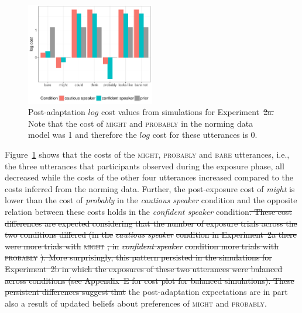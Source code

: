 \documentclass[man, floatsintext]{apa6}
\providecommand{\DIFadd}[1]{{\protect\color{blue}\uwave{#1}}} %
\providecommand{\DIFdel}[1]{{\protect\color{red}\sout{#1}}}                      %
\providecommand{\DIFaddbegin}{} %
\providecommand{\DIFaddend}{} %
\providecommand{\DIFdelbegin}{} %
\providecommand{\DIFdelend}{} %
\providecommand{\DIFaddFL}[1]{\DIFadd{#1}} %
\providecommand{\DIFdelFL}[1]{\DIFdel{#1}} %
\providecommand{\DIFaddbeginFL}{} %
\providecommand{\DIFaddendFL}{} %
\providecommand{\DIFdelbeginFL}{} %
\providecommand{\DIFdelendFL}{} %
\newcommand{\DIFscaledelfig}{0.5}
\newlength{\DIFdelgraphicswidth} %
\newlength{\DIFdelgraphicsheight} %
\newcommand{\DIFaddincludegraphics}[2][]{{\color{blue}\fbox{\DIFOincludegraphics[#1]{#2}}}} %
\newcommand{\DIFdelincludegraphics}[2][]{%
\sbox{\DIFdelgraphicsbox}{\DIFOincludegraphics[#1]{#2}}%
\settoboxwidth{\DIFdelgraphicswidth}{\DIFdelgraphicsbox} %
\settoboxtotalheight{\DIFdelgraphicsheight}{\DIFdelgraphicsbox} %
\scalebox{\DIFscaledelfig}{%
\parbox[b]{\DIFdelgraphicswidth}{\usebox{\DIFdelgraphicsbox}\\[-\baselineskip] \rule{\DIFdelgraphicswidth}{0em}}\llap{\resizebox{\DIFdelgraphicswidth}{\DIFdelgraphicsheight}{%
\setlength{\unitlength}{\DIFdelgraphicswidth}%
\begin{picture}(1,1)%
\thicklines\linethickness{2pt} %
{\color[rgb]{1,0,0}\put(0,0){\framebox(1,1){}}}%
{\color[rgb]{1,0,0}\put(0,0){\line( 1,1){1}}}%
{\color[rgb]{1,0,0}\put(0,1){\line(1,-1){1}}}%
\end{picture}%
}\hspace*{3pt}}} %
} %
\DeclareRobustCommand{\DIFaddbegin}{\DIFOaddbegin \let\includegraphics\DIFaddincludegraphics} %
\DeclareRobustCommand{\DIFaddend}{\DIFOaddend \let\includegraphics\DIFOincludegraphics} %
\DeclareRobustCommand{\DIFdelbegin}{\DIFOdelbegin \let\includegraphics\DIFdelincludegraphics} %
\DeclareRobustCommand{\DIFdelend}{\DIFOaddend \let\includegraphics\DIFOincludegraphics} %
\DeclareRobustCommand{\DIFaddbeginFL}{\DIFOaddbeginFL \let\includegraphics\DIFaddincludegraphics} %
\DeclareRobustCommand{\DIFaddendFL}{\DIFOaddendFL \let\includegraphics\DIFOincludegraphics} %
\DeclareRobustCommand{\DIFdelbeginFL}{\DIFOdelbeginFL \let\includegraphics\DIFdelincludegraphics} %
\DeclareRobustCommand{\DIFdelendFL}{\DIFOaddendFL \let\includegraphics\DIFOincludegraphics} %
\begin{document}
\begin{figure}
\center
  \DIFdelbeginFL %
\DIFdelendFL \DIFaddbeginFL \includegraphics[width=0.5\textwidth]{plots/adaptation-posterior-costs-replication.pdf}
  \DIFaddendFL \caption{Post-adaptation $log$ cost values from simulations for Experiment~\DIFdelbeginFL \DIFdelFL{2a. }\DIFdelendFL \DIFaddbeginFL \DIFaddFL{2. }\DIFaddendFL Note that the cost of \textsc{might} and \textsc{probably} 
  in the norming data model was 1 and therefore the $log$ cost for these utterances is 0. \label{fig:post-exposure-costs}}
\end{figure}

Figure~\ref{fig:post-exposure-costs} shows that the costs of the \textsc{might}, \textsc{probably} and
\textsc{bare} utterances, i.e., the three utterances that participants observed during the exposure phase,
all decreased while the costs of the other four utterances increased compared to the costs inferred from the norming
data. Further, the post-exposure cost of \textit{might} is lower than the cost of \textit{probably} in the \textit{cautious speaker} condition
and the opposite relation between these costs holds in the \textit{confident speaker} condition\DIFdelbegin \DIFdel{. These cost differences
are expected considering that the number of exposure trials across the two conditions differed (in the }\textit{\DIFdel{cautious speaker}} %
\DIFdel{condition in Experiment~2a there were more trials
with }\textsc{\DIFdel{might}}%
\DIFdel{; in }\textit{\DIFdel{confident speaker}} %
\DIFdel{condition more trials with }\textsc{\DIFdel{probably}}%
\DIFdel{). More surprisingly, this pattern
persisted in the simulations for Experiment~2b in which the exposures of these two utterances were balanced across conditions 
(see Appendix~E for cost plot for balanced simulations).
These persistent differences suggest that
}\DIFdelend \DIFaddbegin \DIFadd{, which suggests that
that }\DIFaddend the post-adaptation expectations are in part also a result of updated beliefs about preferences of \textsc{might} and \textsc{probably}. 
\end{document}

